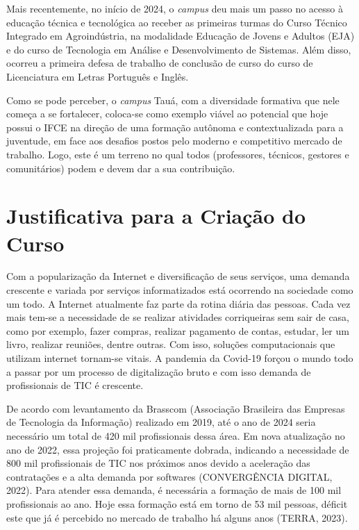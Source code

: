 Mais recentemente, no início de 2024, o \textit{campus} deu mais um passo no acesso à
educação técnica e tecnológica ao receber as primeiras turmas do Curso Técnico
Integrado em Agroindústria, na modalidade Educação de Jovens e Adultos (EJA) e do curso de Tecnologia em Análise e Desenvolvimento de Sistemas. 
Além disso, ocorreu a primeira defesa de trabalho de conclusão de curso do curso de Licenciatura em Letras Português e Inglês.


Como se pode perceber, o \textit{campus} Tauá, com a diversidade formativa que
nele começa a se fortalecer, coloca-se como exemplo viável ao potencial que hoje
possui o IFCE na direção de uma formação autônoma e contextualizada para a
juventude, em face aos desafios postos pelo moderno e competitivo mercado de
trabalho. Logo, este é um terreno no qual todos (professores, técnicos, gestores
e comunitários) podem e devem dar a sua contribuição.



\chapter{Justificativa para a Criação do Curso}

Com a popularização da Internet e diversificação de seus serviços, uma demanda
crescente e variada por serviços informatizados está ocorrendo na sociedade como
um todo.  A Internet atualmente faz parte da rotina diária das pessoas. Cada vez
mais tem-se a necessidade de se realizar atividades corriqueiras sem sair de
casa, como por exemplo, fazer compras, realizar pagamento de contas, estudar,
ler um livro, realizar reuniões, dentre outras. Com isso, soluções
computacionais que utilizam internet tornam-se vitais. A pandemia da Covid-19 forçou o mundo todo a passar
por um processo de digitalização bruto e com isso demanda de profissionais de TIC é crescente. 

De acordo com levantamento
da Brasscom (Associação Brasileira das Empresas de Tecnologia da Informação)
realizado em 2019, até o ano de 2024 seria necessário um total de 420 mil
profissionais dessa área. Em nova atualização no ano de 2022, essa projeção foi
praticamente dobrada, indicando a necessidade de 800 mil profissionais de TIC nos
próximos anos devido a aceleração das contratações e a alta demanda por softwares
(CONVERGÊNCIA DIGITAL, 2022). Para atender essa demanda, é necessária a
formação de mais de 100 mil profissionais ao ano. Hoje essa formação está em torno
de 53 mil pessoas, déficit este que já é percebido no mercado de trabalho há alguns
anos (TERRA, 2023).


